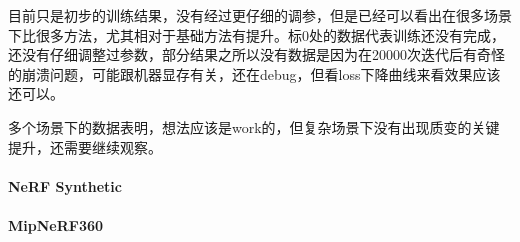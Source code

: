 目前只是初步的训练结果，没有经过更仔细的调参，但是已经可以看出在很多场景下比很多方法，尤其相对于基础方法有提升。标0处的数据代表训练还没有完成，还没有仔细调整过参数，部分结果之所以没有数据是因为在20000次迭代后有奇怪的崩溃问题，可能跟机器显存有关，还在debug，但看loss下降曲线来看效果应该还可以。


多个场景下的数据表明，想法应该是work的，但复杂场景下没有出现质变的关键提升，还需要继续观察。

\paragraph{NeRF Synthetic}



\paragraph{MipNeRF360}



